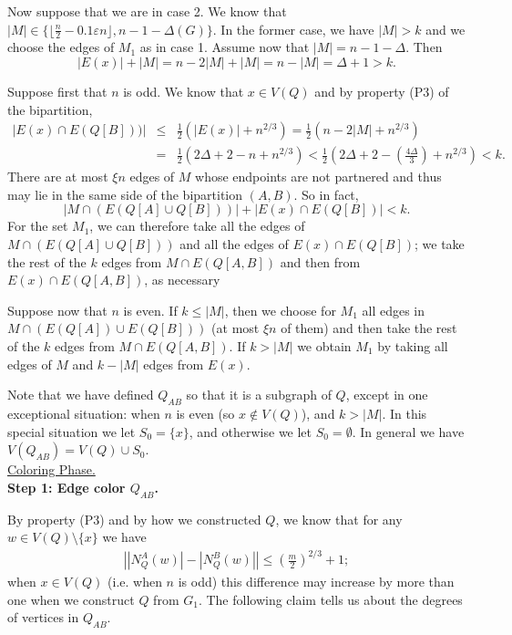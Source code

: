 \documentclass[11pt, oneside]{article}
\newcommand{\ve}{\varepsilon}
\begin{document}
Now suppose that we are in case 2. We know that $|M|\in\{\lfloor \frac{n}{2} - 0.1 \ve n \rfloor, n-1-\Delta(G) \}$. In the former case, we have $|M|>k$ and we choose the edges of $M_1$ as in case 1. Assume now that $|M|=n-1-\Delta$. Then
$$|E(x)|+|M|=n-2|M|+|M|=n-|M|=\Delta+1>k.$$

Suppose first that $n$ is odd. We know that  $x\in V(Q)$ and by property (P3) of the bipartition,
\begin{eqnarray*}|E(x)\cap E(Q[B]))| &\leq& \tfrac{1}{2}\left(|E(x)|+ n^{2/3}\right)=\tfrac{1}{2}(n-2|M|+n^{2/3})\\
&= & \tfrac{1}{2}(2\Delta+2-n+n^{2/3}) < \tfrac{1}{2}(2\Delta+2-(\tfrac{4\Delta}{3})+n^{2/3})<k.
\end{eqnarray*}
There are at most $\xi n$ edges of $M$ whose endpoints are not partnered and thus may lie in the same side of the bipartition $(A, B)$.  So in fact, 
$$     |M\cap (E(Q[A]\cup Q[B]))|+|E(x)\cap E(Q[B])|  <k. $$
For the set $M_1$, we can therefore take all the edges of $M\cap (E(Q[A]\cup Q[B]))$ and all the edges of $E(x)\cap E(Q[B])$; we take the rest of the $k$ edges from $M\cap E(Q[A, B])$ and then from $E(x)\cap E(Q[A, B])$, as necessary

Suppose now that $n$ is even. If $k\leq |M|$, then we choose for $M_1$ all edges in $M\cap (E(Q[A])\cup E(Q[B]))$ (at most $\xi n$ of them) and then take the rest of the $k$ edges from $M\cap E(Q[A, B])$. If $k>|M|$ we obtain $M_1$ by taking all edges of $M$ and $k-|M|$ edges from $E(x)$. 


Note that we have defined $Q_{AB}$ so that it is a subgraph of $Q$, except in one exceptional situation: when $n$ is even (so $x\not\in V(Q)$), and $k>|M|$. In this special situation we let $S_0=\{x\}$, and otherwise we let $S_0=\emptyset$. In general we have $V(Q_{AB})=V(Q)\cup S_0$.\\



\noindent \underline{{\sc Coloring Phase.}}\\


\noindent \textbf{Step 1: Edge color $Q_{AB}$.}


By property (P3) and by how we constructed $Q$, we know that for any  $w\in V(Q)\setminus \{x\}$ we have
\begin{eqnarray}\label{eqn:partition-neighbor-difference}
    \left||N^A_Q(w)|-|N^B_Q(w)|\right| \le  (\tfrac{m}{2})^{2/3} +1; 
\end{eqnarray}
when $x\in V(Q)$ (i.e. when $n$ is odd) this difference may increase by more than one when we construct $Q$ from $G_1$. The following claim tells us about the degrees of vertices in $Q_{AB}$.\\
\end{document}
